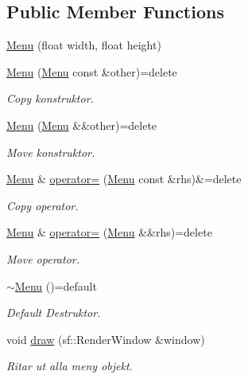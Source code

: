 \subsection*{Public Member Functions}
\begin{DoxyCompactItemize}
\item 
\hyperlink{classMenu_a8caa6100506d4b8e0d782e550dbc470e}{Menu} (float width, float height)
\item 
\hyperlink{classMenu_a3c4832a05323c234e6bb9b949b768bcd}{Menu} (\hyperlink{classMenu}{Menu} const \&other)=delete
\begin{DoxyCompactList}\small\item\em Copy konstruktor. \end{DoxyCompactList}\item 
\hyperlink{classMenu_a31b3412d1fa95e0acb0dd931add9df44}{Menu} (\hyperlink{classMenu}{Menu} \&\&other)=delete
\begin{DoxyCompactList}\small\item\em Move konstruktor. \end{DoxyCompactList}\item 
\hyperlink{classMenu}{Menu} \& \hyperlink{classMenu_ac388d81e62249a18c2ba186a25c5f5b0}{operator=} (\hyperlink{classMenu}{Menu} const \&rhs)\&=delete
\begin{DoxyCompactList}\small\item\em Copy operator. \end{DoxyCompactList}\item 
\hyperlink{classMenu}{Menu} \& \hyperlink{classMenu_aa14291c8988294534bae31188a0aa70b}{operator=} (\hyperlink{classMenu}{Menu} \&\&rhs)=delete
\begin{DoxyCompactList}\small\item\em Move operator. \end{DoxyCompactList}\item 
\hyperlink{classMenu_aec66e8695cecd5e88732d20ffd027921}{$\sim$\+Menu} ()=default
\begin{DoxyCompactList}\small\item\em Default Destruktor. \end{DoxyCompactList}\item 
void \hyperlink{classMenu_a1443dcfd1c1c9844c40658d752c1fbab}{draw} (sf\+::\+Render\+Window \&window)
\begin{DoxyCompactList}\small\item\em Ritar ut alla meny objekt. \end{DoxyCompactList}\item 

\end{DoxyCompactItemize}
